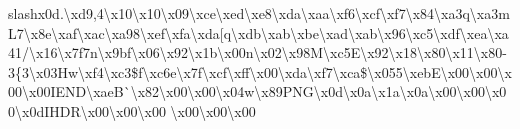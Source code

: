 slash{}x0d.\textbackslash{}xd9,4\textbackslash{}x10\textbackslash{}x10\textbackslash{}x09\textbackslash{}xce\textbackslash{}xed\textbackslash{}xe8\textbackslash{}xda\textbackslash{}xaa\textbackslash{}xf6\textbackslash{}xcf\textbackslash{}xf7\textbackslash{}x84\textbackslash{}xa3q\textbackslash{}xa3m\+L7\textbackslash{}x8e\textbackslash{}xaf\textbackslash{}xac\textbackslash{}xa98\textbackslash{}xef\textbackslash{}xfa\textbackslash{}xda\mbox{[}q\textbackslash{}xdb\textbackslash{}xab\textbackslash{}xbe\textbackslash{}xad\textbackslash{}xab\textbackslash{}x96\textbackslash{}xc5\textbackslash{}xdf\textbackslash{}xea\textbackslash{}xa41/\textbackslash{}x16\textbackslash{}x7f7n\textbackslash{}x9bf\textbackslash{}x06\textbackslash{}x92\textbackslash{}x1b\textbackslash{}x00n\textbackslash{}x02\textbackslash{}x98\+M\textbackslash{}xc5\+E\textbackslash{}x92\textbackslash{}x18\textbackslash{}x80\textbackslash{}x11\textbackslash{}x80-\/3\{3\textbackslash{}x03\+Hw\textbackslash{}xf4\textbackslash{}xc3\$f\textbackslash{}xc6e\textbackslash{}x7f\textbackslash{}xcf\textbackslash{}xff\textbackslash{}x00\textbackslash{}xda\textbackslash{}xf7\textbackslash{}xca\$\textbackslash{}x055\textbackslash{}xeb\+E\textbackslash{}x00\textbackslash{}x00\textbackslash{}x00\textbackslash{}x00\+I\+E\+N\+D\textbackslash{}xae\+B\`{}\textbackslash{}x82\textbackslash{}x00\textbackslash{}x00\textbackslash{}x04w\textbackslash{}x89\+P\+N\+G\textbackslash{}x0d\textbackslash{}x0a\textbackslash{}x1a\textbackslash{}x0a\textbackslash{}x00\textbackslash{}x00\textbackslash{}x00\textbackslash{}x0d\+I\+H\+D\+R\textbackslash{}x00\textbackslash{}x00\textbackslash{}x00 \textbackslash{}x00\textbackslash{}x00\textbackslash{}x00 